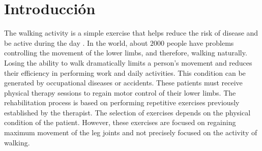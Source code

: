 
\section{Introducción}


The walking activity is a simple exercise that helps reduce the risk of disease and be active during the day \cite{lee2008importance}. In the world, about $2000$ people have problems controlling the movement of the lower limbs, and therefore, walking naturally. Losing the ability to walk dramatically limits a person's movement and reduces their efficiency in performing work and daily activities. This condition can be generated by occupational diseases or accidents. These patients must receive physical therapy sessions to regain motor control of their lower limbs. The rehabilitation process is based on performing repetitive exercises previously established by the therapist. The selection of exercises depends on the physical condition of the patient. However, these exercises are focused on regaining maximum movement of the leg joints and not precisely focused on the activity of walking.


